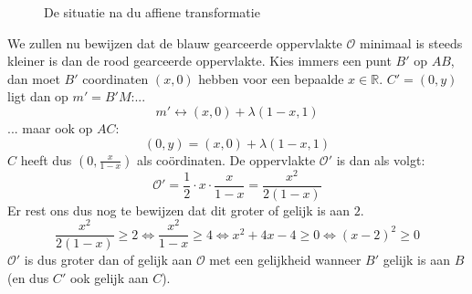 \documentclass[main.tex]{subfiles}
\begin{document}
\begin{enumerate}
  \begin{figure}[H]
    \centering
    \caption{De situatie na du affiene transformatie}
  \end{figure}

  We zullen nu bewijzen dat de blauw gearceerde oppervlakte $\mathcal{O}$ minimaal is steeds kleiner is dan de rood gearceerde oppervlakte.
  Kies immers een punt $B'$ op $AB$, dan moet $B'$ coordinaten $(x,0)$ hebben voor een bepaalde $x\in \mathbb{R}$.
  $C'=(0,y)$ ligt dan op $m'=B'M$:...
  \[ m' \leftrightarrow (x,0) + \lambda(1-x,1) \]
  ... maar ook op $AC$:
  \[ (0,y) = (x,0) + \lambda (1-x,1) \]
  $C$ heeft dus $(0,\frac{x}{1-x})$ als co\"ordinaten. 
  De oppervlakte $\mathcal{O}'$ is dan als volgt:
  \[ \mathcal{O}' = \frac{1}{2} \cdot x \cdot \frac{x}{1-x} = \frac{x^{2}}{2(1-x)} \]
  Er rest ons dus nog te bewijzen dat dit groter of gelijk is aan $2$.
  \[ \frac{x^{2}}{2(1-x)} \ge 2 \Leftrightarrow \frac{x^{2}}{1-x} \ge 4 \Leftrightarrow x^{2}+4x-4 \ge 0 \Leftrightarrow (x-2)^{2} \ge 0 \]
  $\mathcal{O}'$ is dus groter dan of gelijk aan $\mathcal{O}$ met een gelijkheid wanneer $B'$ gelijk is aan $B$ (en dus $C'$ ook gelijk aan $C$).


\end{enumerate}
\end{document}
